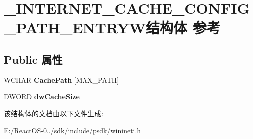\hypertarget{struct___i_n_t_e_r_n_e_t___c_a_c_h_e___c_o_n_f_i_g___p_a_t_h___e_n_t_r_y_w}{}\section{\+\_\+\+I\+N\+T\+E\+R\+N\+E\+T\+\_\+\+C\+A\+C\+H\+E\+\_\+\+C\+O\+N\+F\+I\+G\+\_\+\+P\+A\+T\+H\+\_\+\+E\+N\+T\+R\+Y\+W结构体 参考}
\label{struct___i_n_t_e_r_n_e_t___c_a_c_h_e___c_o_n_f_i_g___p_a_t_h___e_n_t_r_y_w}
\subsection*{Public 属性}
\begin{DoxyCompactItemize}
\item 
\mbox{\label{struct___i_n_t_e_r_n_e_t___c_a_c_h_e___c_o_n_f_i_g___p_a_t_h___e_n_t_r_y_w_a8f64f9c7f01f9f2e474ce2b7ead16246}} 
W\+C\+H\+AR {\bfseries Cache\+Path} \mbox{[}M\+A\+X\+\_\+\+P\+A\+TH\mbox{]}
\item 
\mbox{\label{struct___i_n_t_e_r_n_e_t___c_a_c_h_e___c_o_n_f_i_g___p_a_t_h___e_n_t_r_y_w_aa4039015d3af8d21ed4bb4a67d6e29bd}} 
D\+W\+O\+RD {\bfseries dw\+Cache\+Size}
\end{DoxyCompactItemize}


该结构体的文档由以下文件生成\+:\begin{DoxyCompactItemize}
\item 
E\+:/\+React\+O\+S-\/0../sdk/include/psdk/winineti.\+h\end{DoxyCompactItemize}
